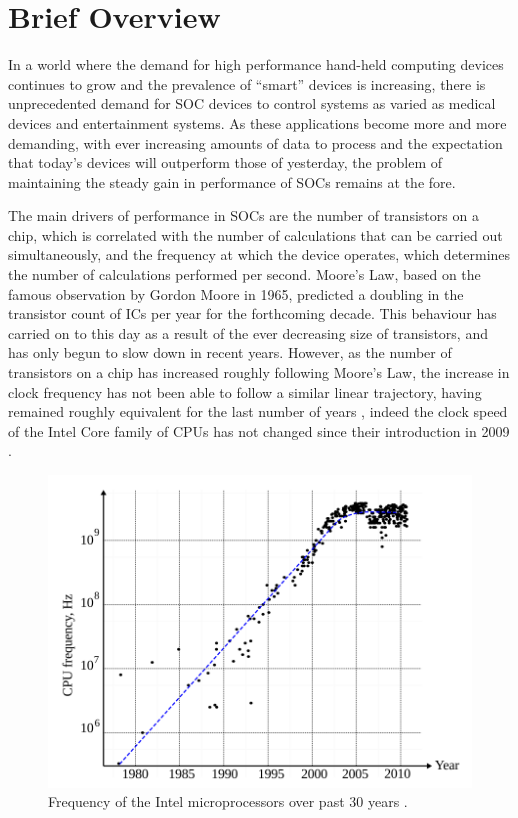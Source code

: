 \section{Brief Overview}
In a world where the demand for high performance hand-held computing devices continues to grow and the prevalence of ``smart'' devices is increasing, there is unprecedented demand for \ac{SOC} devices to control systems as varied as medical devices and entertainment systems.
As these applications become more and more demanding, with ever increasing amounts of data to process and the expectation that today's devices will outperform those of yesterday, the problem of maintaining the steady gain in performance of \acp{SOC} remains at the fore.

The main drivers of performance in \acp{SOC} are the number of transistors on a chip, which is correlated with the number of calculations that can be carried out simultaneously, and the frequency at which the device operates, which determines the number of calculations performed per second.
Moore's Law, based on the famous observation by Gordon Moore in 1965\cite{moore1965cramming}, predicted a doubling in the transistor count of \ac{IC}s per year for the forthcoming decade. This behaviour has carried on to this day as a result of the ever decreasing size of transistors, and has only begun to slow down in recent years.
However, as the number of transistors on a chip has increased roughly following Moore's Law, the increase in clock frequency has not been able to follow a similar linear trajectory, having remained roughly equivalent for the last number of years \cite{ross2008cpu}, indeed the clock speed of the Intel Core family of \ac{CPU}s has not changed since their introduction in 2009 \cite{intelark}.
\begin{figure}[h]
	\centering
	\includegraphics[scale=0.4]{../eldar_last_30_yrs}
	\caption[Frequency of the Intel microprocessors over past 30 years]{Frequency of the Intel microprocessors over past 30 years \cite{zianbetov2013phd}.}
	\label{fig:eldar_last_30_yrs}
\end{figure}\\
